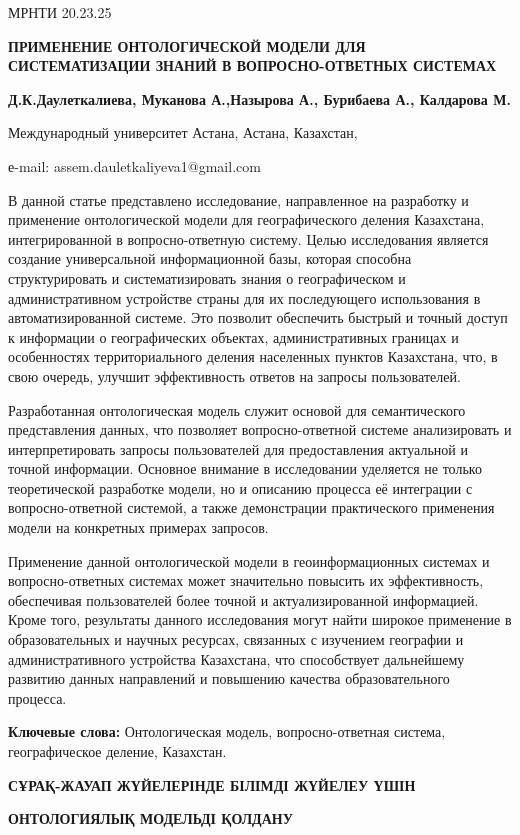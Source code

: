 МРНТИ 20.23.25

\textbf{ПРИМЕНЕНИЕ ОНТОЛОГИЧЕСКОЙ МОДЕЛИ ДЛЯ СИСТЕМАТИЗАЦИИ ЗНАНИЙ В
ВОПРОСНО-ОТВЕТНЫХ СИСТЕМАХ}

\textbf{Д.К.Даулеткалиева, Муканова А.,Назырова А., Бурибаева А.,
Калдарова М.}

Международный университет Астана, Астана, Казахстан,

е-mail: assem.dauletkaliyeva1@gmail.com

В данной статье представлено исследование, направленное на разработку и
применение онтологической модели для географического деления Казахстана,
интегрированной в вопросно-ответную систему. Целью исследования является
создание универсальной информационной базы, которая способна
структурировать и систематизировать знания о географическом и
административном устройстве страны для их последующего использования в
автоматизированной системе. Это позволит обеспечить быстрый и точный
доступ к информации о географических объектах, административных границах
и особенностях территориального деления населенных пунктов Казахстана,
что, в свою очередь, улучшит эффективность ответов на запросы
пользователей.

Разработанная онтологическая модель служит основой для семантического
представления данных, что позволяет вопросно-ответной системе
анализировать и интерпретировать запросы пользователей для
предоставления актуальной и точной информации. Основное внимание в
исследовании уделяется не только теоретической разработке модели, но и
описанию процесса её интеграции с вопросно-ответной системой, а также
демонстрации практического применения модели на конкретных примерах
запросов.

Применение данной онтологической модели в геоинформационных системах и
вопросно-ответных системах может значительно повысить их эффективность,
обеспечивая пользователей более точной и актуализированной информацией.
Кроме того, результаты данного исследования могут найти широкое
применение в образовательных и научных ресурсах, связанных с изучением
географии и административного устройства Казахстана, что способствует
дальнейшему развитию данных направлений и повышению качества
образовательного процесса.

\textbf{Ключевые слова:} Онтологическая модель, вопросно-ответная
система, географическое деление, Казахстан.

\textbf{СҰРАҚ-ЖАУАП ЖҮЙЕЛЕРІНДЕ БІЛІМДІ ЖҮЙЕЛЕУ ҮШІН}

\textbf{ОНТОЛОГИЯЛЫҚ МОДЕЛЬДІ ҚОЛДАНУ}

